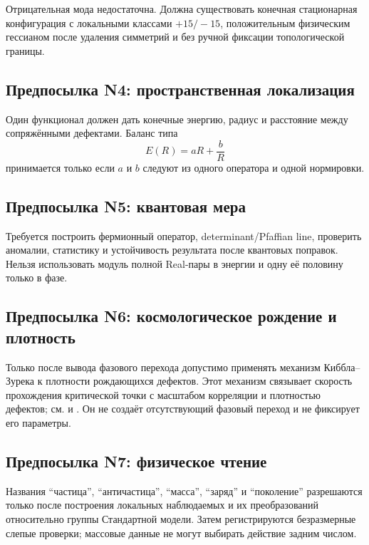 Отрицательная мода недостаточна. Должна существовать конечная стационарная
конфигурация с локальными классами $+15/-15$, положительным физическим
гессианом после удаления симметрий и без ручной фиксации топологической
границы.

\subsection*{Предпосылка N4: пространственная локализация}

Один функционал должен дать конечные энергию, радиус и расстояние между
сопряжёнными дефектами. Баланс типа
\begin{equation}
 E(R)=aR+\frac bR
\end{equation}
принимается только если $a$ и $b$ следуют из одного оператора и одной
нормировки.

\subsection*{Предпосылка N5: квантовая мера}

Требуется построить фермионный оператор, determinant/Pfaffian line,
проверить аномалии, статистику и устойчивость результата после
квантовых поправок. Нельзя использовать модуль полной Real-пары в энергии
и одну её половину только в фазе.

\subsection*{Предпосылка N6: космологическое рождение и плотность}

Только после вывода фазового перехода допустимо применять механизм
Киббла--Зурека к плотности рождающихся дефектов. Этот механизм связывает
скорость прохождения критической точки с масштабом корреляции и плотностью
дефектов; см.  и
. Он не создаёт отсутствующий фазовый переход и не
фиксирует его параметры.

\subsection*{Предпосылка N7: физическое чтение}

Названия ``частица'', ``античастица'', ``масса'', ``заряд'' и
``поколение'' разрешаются только после построения локальных наблюдаемых и
их преобразований относительно группы Стандартной модели. Затем
регистрируются безразмерные слепые проверки; массовые данные не могут
выбирать действие задним числом.

